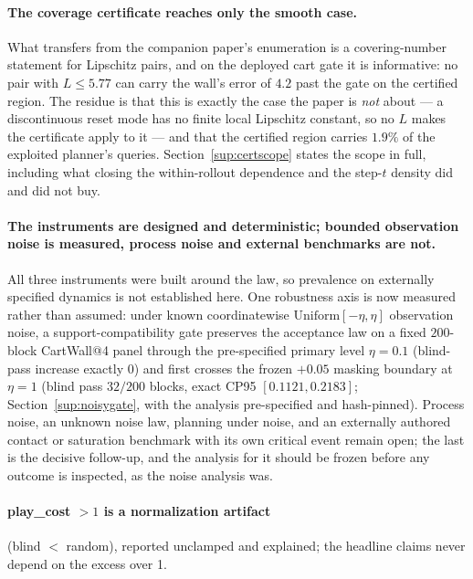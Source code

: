 \documentclass[11pt]{article}
\theoremstyle{definition}
\theoremstyle{remark}
\begin{document}
\paragraph{The coverage certificate reaches only the smooth case.} What transfers from the companion paper's enumeration is a covering-number statement for Lipschitz pairs, and on the deployed cart gate it is informative: no pair with $L \leq 5.77$ can carry the wall's error of $4.2$ past the gate on the certified region. The residue is that this is exactly the case the paper is \emph{not} about --- a discontinuous reset mode has no finite local Lipschitz constant, so no $L$ makes the certificate apply to it --- and that the certified region carries $1.9\%$ of the exploited planner's queries. Section~\ref{sup:certscope} states the scope in full, including what closing the within-rollout dependence and the step-$t$ density did and did not buy.

\paragraph{The instruments are designed and deterministic; bounded observation noise is measured, process noise and external benchmarks are not.} All three instruments were built around the law, so prevalence on externally specified dynamics is not established here. One robustness axis is now measured rather than assumed: under known coordinatewise $\mathrm{Uniform}[-\eta,\eta]$ observation noise, a support-compatibility gate preserves the acceptance law on a fixed $200$-block CartWall@4 panel through the pre-specified primary level $\eta = 0.1$ (blind-pass increase exactly $0$) and first crosses the frozen $+0.05$ masking boundary at $\eta = 1$ (blind pass $32/200$ blocks, exact CP95 $[0.1121, 0.2183]$; Section~\ref{sup:noisygate}, with the analysis pre-specified and hash-pinned). Process noise, an unknown noise law, planning under noise, and an externally authored contact or saturation benchmark with its own critical event remain open; the last is the decisive follow-up, and the analysis for it should be frozen before any outcome is inspected, as the noise analysis was.

\paragraph{play\_cost $> 1$ is a normalization artifact} (blind $<$ random), reported unclamped and explained; the headline claims never depend on the excess over 1.
\end{document}
